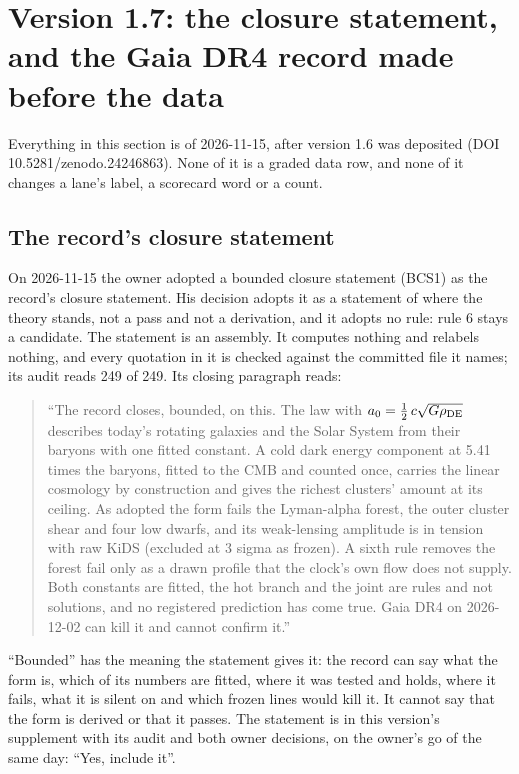 \documentclass[10pt]{article}
\begin{document}
\section{Version 1.7: the closure statement, and the Gaia DR4 record made before the data}
Everything in this section is of 2026-11-15, after version 1.6 was deposited (DOI 10.5281/zenodo.24246863). None of it is a graded data row, and none of it changes a lane's label, a scorecard word or a count.

\subsection{The record's closure statement}
On 2026-11-15 the owner adopted a bounded closure statement (BCS1) as the record's closure statement. His decision adopts it as a statement of where the theory stands, not a pass and not a derivation, and it adopts no rule: rule 6 stays a candidate. The statement is an assembly. It computes nothing and relabels nothing, and every quotation in it is checked against the committed file it names; its audit reads 249 of 249. Its closing paragraph reads:

\begin{quote}
``The record closes, bounded, on this. The law with $a_0=\tfrac12\,c\sqrt{G\rho_{\rm DE}}$ describes today's rotating galaxies and the Solar System from their baryons with one fitted constant. A cold dark energy component at 5.41 times the baryons, fitted to the CMB and counted once, carries the linear cosmology by construction and gives the richest clusters' amount at its ceiling. As adopted the form fails the Lyman-alpha forest, the outer cluster shear and four low dwarfs, and its weak-lensing amplitude is in tension with raw KiDS (excluded at 3 sigma as frozen). A sixth rule removes the forest fail only as a drawn profile that the clock's own flow does not supply. Both constants are fitted, the hot branch and the joint are rules and not solutions, and no registered prediction has come true. Gaia DR4 on 2026-12-02 can kill it and cannot confirm it.''
\end{quote}

``Bounded'' has the meaning the statement gives it: the record can say what the form is, which of its numbers are fitted, where it was tested and holds, where it fails, what it is silent on and which frozen lines would kill it. It cannot say that the form is derived or that it passes. The statement is in this version's supplement with its audit and both owner decisions, on the owner's go of the same day: ``Yes, include it''.
\end{document}
